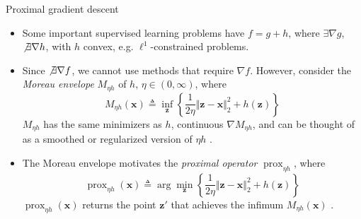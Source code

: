 \documentclass{beamer}
\numberwithin{equation}{section}
\begin{document}
\begin{frame}{Proximal gradient descent}
    \begin{itemize}
        \item
        Some important supervised learning problems have $ f = g + h $, where
        $ \exists\nabla g $, $ \not\exists\nabla h $, with $ h $ convex, e.g.
        $ \ell^1 $-constrained problems.

        \item
        Since $ \not\exists\nabla f $, we cannot use methods that require
        $ \nabla f $. However, consider the \textit{Moreau envelope}
        $ M_{\eta h} $ of $ h $, $ \eta \in (0, \infty) $, where
        \cite{prox_algos}
        \begin{equation} \label{eq:moreau_envelope}
            M_{\eta h}(\mathbf{x}) \triangleq \inf_\mathbf{z}\left\{
                \frac{1}{2\eta}\Vert\mathbf{z} - \mathbf{x}\Vert_2^2 +
                h(\mathbf{z})
            \right\}
        \end{equation}
        $ M_{\eta h} $ has the same minimizers as $ h $, continuous
        $ \nabla M_{\eta h} $, and can be thought of as a smoothed or
        regularized version of $ \eta h $ \cite{prox_algos}.

        \item
        The Moreau envelope motivates the \textit{proximal operator}
        $ \operatorname{prox}_{\eta h} $, where
        \begin{equation} \label{eq:prox_operator}
            \operatorname{prox}_{\eta h}(\mathbf{x}) \triangleq
            \arg\min_\mathbf{z}\left\{
                \frac{1}{2\eta}\Vert\mathbf{z} - \mathbf{x}\Vert_2^2 +
                h(\mathbf{z})
            \right\}
        \end{equation}
        $ \operatorname{prox}_{\eta h}(\mathbf{x}) $ returns the point
        $ \mathbf{z}' $ that achieves the infimum $ M_{\eta h}(\mathbf{x}) $
        \cite{prox_algos}.
    \end{itemize}

    \medskip
\end{frame}
\end{document}
